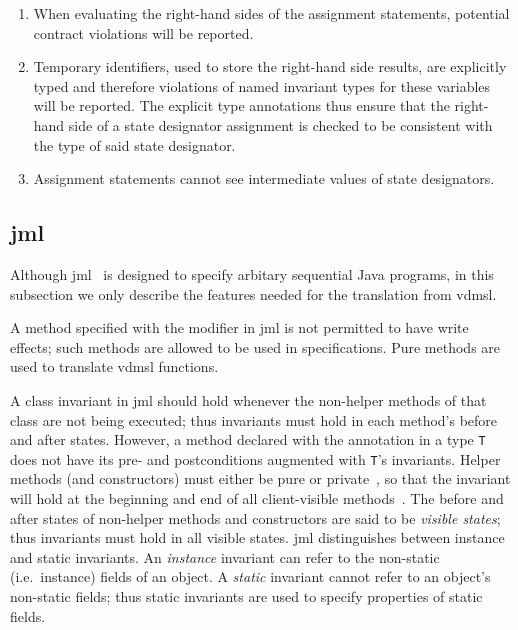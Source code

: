 \begin{enumerate}

\item When evaluating the right-hand sides of the assignment
  statements, potential contract violations will be reported.

\item Temporary identifiers, used to store the right-hand side
  results, are explicitly typed and therefore violations of named
  invariant types for these variables will be reported. The explicit
  type annotations thus ensure that the right-hand side of a state
  designator assignment is checked to be consistent with the type of
  said state designator.

\item Assignment statements cannot see intermediate values of state
  designators.

\end{enumerate}

\subsection{\ac{jml}}
\label{sec:jml}

Although \ac{jml}~\cite{Leavens&13} is designed to specify arbitary
sequential Java programs, in this subsection we only describe the
features needed for the translation from \ac{vdmsl}.

A method specified with the  modifier in \ac{jml} is not
permitted to have write effects; such 
methods are allowed to be used in specifications. Pure methods are
used to translate \ac{vdmsl} functions.

A class invariant in \ac{jml} should hold whenever the non-helper
methods of that class are not being executed; thus invariants must
hold in each method's before and after states. However, a method
declared with the  annotation in a type \texttt{T} does not
have its pre- and postconditions augmented with \texttt{T}'s
invariants.  Helper methods (and constructors) must either be pure or
private~\cite{Leavens&13}, so that the invariant will hold at the
beginning and end of all client-visible
methods~\cite{Mueller-Poetzsch-Heffter-Leavens06}. The before and
after states of non-helper methods and constructors are said to be
\emph{visible states}; thus invariants must hold in all visible
states.  \ac{jml} distinguishes between instance and static
invariants. An \emph{instance} invariant can refer to the non-static
(i.e.\ instance) fields of an object.  A \emph{static\/} invariant
cannot refer to an object's non-static fields; thus static invariants
are used to specify properties of static fields.

